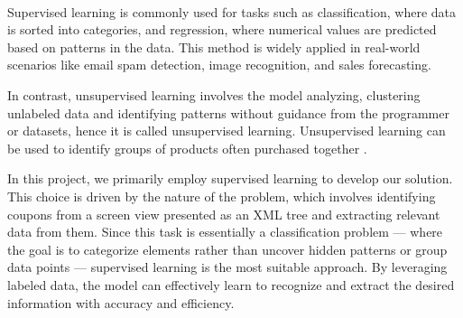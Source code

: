 \documentclass[licencjacka,en]{pracamgr}
\begin{document}
\begin{center}
    \begin{minipage}{0.9\textwidth} %
    \end{minipage}\\[5mm] %
    \begin{minipage}{0.9\textwidth} %
    \end{minipage}
\end{center}

Supervised learning is commonly used for tasks such as classification, where data is sorted into categories, and regression, where numerical values are predicted based on patterns in the data. This method is widely applied in real-world scenarios like email spam detection, image recognition, and sales forecasting. 

In contrast, unsupervised learning involves the model analyzing, clustering unlabeled data and identifying patterns without guidance from the programmer or datasets, hence it is called unsupervised learning. Unsupervised learning can be used to identify groups of products often purchased together \cite{supervised_ibm}.

In this project, we primarily employ supervised learning to develop our solution. This choice is driven by the nature of the problem, which involves identifying coupons from a screen view presented as an XML tree and extracting relevant data from them. Since this task is essentially a classification problem — where the goal is to categorize elements rather than uncover hidden patterns or group data points — supervised learning is the most suitable approach. By leveraging labeled data, the model can effectively learn to recognize and extract the desired information with accuracy and efficiency.
\end{document}
